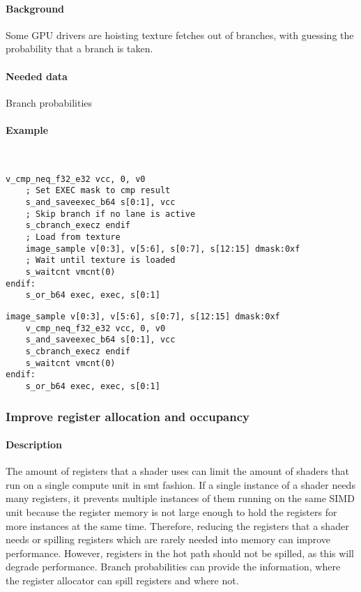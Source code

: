 \paragraph{Background} Some GPU drivers are hoisting texture fetches out of branches, with guessing the probability that a branch is taken.
\paragraph{Needed data} Branch probabilities
\paragraph{Example}\ \\
\begin{minipage}{.47\textwidth}
	\begin{lstlisting}[caption={Load Hoisting --- unoptimized},frame=tlrb,language={[amdgpu]Assembler}]
	v_cmp_neq_f32_e32 vcc, 0, v0
	; Set EXEC mask to cmp result
	s_and_saveexec_b64 s[0:1], vcc
	; Skip branch if no lane is active
	s_cbranch_execz endif
	; Load from texture
	image_sample v[0:3], v[5:6], s[0:7], s[12:15] dmask:0xf
	; Wait until texture is loaded
	s_waitcnt vmcnt(0)
endif:
	s_or_b64 exec, exec, s[0:1]
	\end{lstlisting}
\end{minipage}\hfill
\begin{minipage}{.47\textwidth}
	\begin{lstlisting}[caption={Load Hoisting --- optimized},frame=tlrb,language={[amdgpu]Assembler}]
	image_sample v[0:3], v[5:6], s[0:7], s[12:15] dmask:0xf
	v_cmp_neq_f32_e32 vcc, 0, v0
	s_and_saveexec_b64 s[0:1], vcc
	s_cbranch_execz endif
	s_waitcnt vmcnt(0)
endif:
	s_or_b64 exec, exec, s[0:1]
	\end{lstlisting}
\end{minipage}

\subsubsection{Improve register allocation and occupancy}
\paragraph{Description} The amount of registers that a shader uses can limit the amount of shaders that run on a single compute unit in \gls{smt} fashion.
If a single instance of a shader needs many registers, it prevents multiple instances of them running on the same SIMD unit because the register memory is not large enough to hold the registers for more instances at the same time.
Therefore, reducing the registers that a shader needs or spilling registers which are rarely needed into memory can improve performance. However, registers in the hot path should not be spilled, as this will degrade performance.
Branch probabilities can provide the information, where the register allocator can spill registers and where not.
